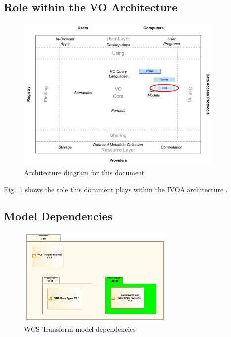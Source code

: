 \documentclass[11pt,a4paper]{ivoa}
\begin{document}
\pagebreak
\subsection{Role within the VO Architecture}

\begin{figure}[h]
\centering


\includegraphics[width=0.9\textwidth]{role_diagram.pdf}
\caption{Architecture diagram for this document}
\label{fig:archdiag}
\end{figure}

Fig.~\ref{fig:archdiag} shows the role this document plays within the
IVOA architecture \citep{note:VOARCH}.

\subsection{Model Dependencies }
  
  \begin{figure}[h]
  \begin{center}
    \includegraphics[width=3.0in]{diagrams/model_dependency.png}
    \caption{WCS Transform model dependencies}\label{fig:overview}
  \end{center}
  \end{figure}
\end{document}
